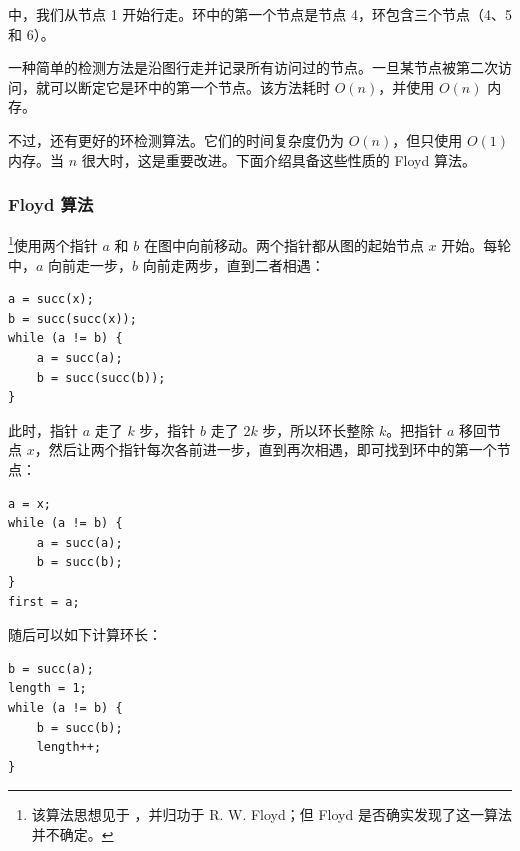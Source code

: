 \begin{center}
\end{center}
中，我们从节点 1 开始行走。环中的第一个节点是节点 4，环包含三个节点（4、5 和 6）。

一种简单的检测方法是沿图行走并记录所有访问过的节点。一旦某节点被第二次访问，就可以断定它是环中的第一个节点。该方法耗时 $O(n)$，并使用 $O(n)$ 内存。

不过，还有更好的环检测算法。它们的时间复杂度仍为 $O(n)$，但只使用 $O(1)$ 内存。当 $n$ 很大时，这是重要改进。下面介绍具备这些性质的 Floyd 算法。

\subsubsection{Floyd 算法}


\footnote{该算法思想见于 \cite{knu982}，并归功于 R. W. Floyd；但 Floyd 是否确实发现了这一算法并不确定。}使用两个指针 $a$ 和 $b$ 在图中向前移动。两个指针都从图的起始节点 $x$ 开始。每轮中，$a$ 向前走一步，$b$ 向前走两步，直到二者相遇：
\begin{lstlisting}
a = succ(x);
b = succ(succ(x));
while (a != b) {
    a = succ(a);
    b = succ(succ(b));
}
\end{lstlisting}

此时，指针 $a$ 走了 $k$ 步，指针 $b$ 走了 $2k$ 步，所以环长整除 $k$。把指针 $a$ 移回节点 $x$，然后让两个指针每次各前进一步，直到再次相遇，即可找到环中的第一个节点：
\begin{lstlisting}
a = x;
while (a != b) {
    a = succ(a);
    b = succ(b);
}
first = a;
\end{lstlisting}

随后可以如下计算环长：
\begin{lstlisting}
b = succ(a);
length = 1;
while (a != b) {
    b = succ(b);
    length++;
}
\end{lstlisting}
